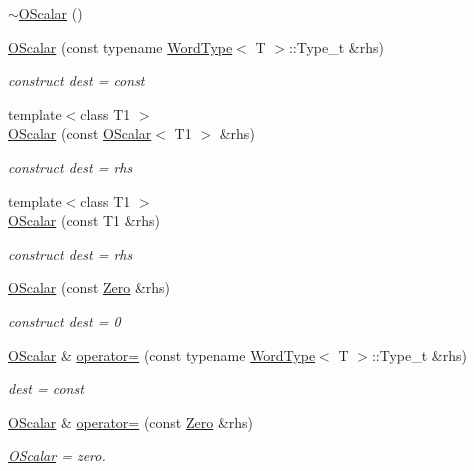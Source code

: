 \begin{DoxyCompactItemize}
\mbox{\hyperlink{classENSEM_1_1OScalar_ac08c93c225f24926096565485406c529}{$\sim$\+O\+Scalar}} ()
\item 
\mbox{\hyperlink{classENSEM_1_1OScalar_a62bd0b52eff623c7e4911aa896c97ccf}{O\+Scalar}} (const typename \mbox{\hyperlink{structENSEM_1_1WordType}{Word\+Type}}$<$ T $>$\+::Type\+\_\+t \&rhs)
\begin{DoxyCompactList}\small\item\em construct dest = const \end{DoxyCompactList}\item 
{\footnotesize template$<$class T1 $>$ }\\\mbox{\hyperlink{classENSEM_1_1OScalar_a12d201aefa6cbf8648247fdcc6f08669}{O\+Scalar}} (const \mbox{\hyperlink{classENSEM_1_1OScalar}{O\+Scalar}}$<$ T1 $>$ \&rhs)
\begin{DoxyCompactList}\small\item\em construct dest = rhs \end{DoxyCompactList}\item 
{\footnotesize template$<$class T1 $>$ }\\\mbox{\hyperlink{classENSEM_1_1OScalar_a63525278c1ba085f57cdc4aafe50aaa9}{O\+Scalar}} (const T1 \&rhs)
\begin{DoxyCompactList}\small\item\em construct dest = rhs \end{DoxyCompactList}\item 
\mbox{\hyperlink{classENSEM_1_1OScalar_a9bc3830b1a4af2e67da73871396ae06c}{O\+Scalar}} (const \mbox{\hyperlink{structENSEM_1_1Zero}{Zero}} \&rhs)
\begin{DoxyCompactList}\small\item\em construct dest = 0 \end{DoxyCompactList}\item 
\mbox{\hyperlink{classENSEM_1_1OScalar}{O\+Scalar}} \& \mbox{\hyperlink{classENSEM_1_1OScalar_a88bbb49d2879dba60c29d7792a8af8dc}{operator=}} (const typename \mbox{\hyperlink{structENSEM_1_1WordType}{Word\+Type}}$<$ T $>$\+::Type\+\_\+t \&rhs)
\begin{DoxyCompactList}\small\item\em dest = const \end{DoxyCompactList}\item 
\mbox{\hyperlink{classENSEM_1_1OScalar}{O\+Scalar}} \& \mbox{\hyperlink{classENSEM_1_1OScalar_a4fdfed29e219b358e05588826e672932}{operator=}} (const \mbox{\hyperlink{structENSEM_1_1Zero}{Zero}} \&rhs)
\begin{DoxyCompactList}\small\item\em \mbox{\hyperlink{classENSEM_1_1OScalar}{O\+Scalar}} = zero. \end{DoxyCompactList}\item 

\end{DoxyCompactItemize}
